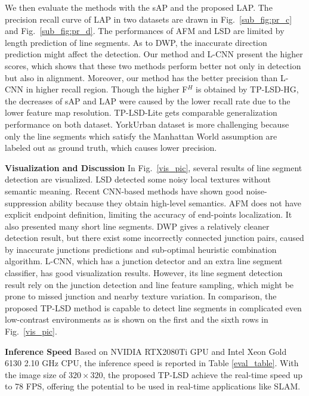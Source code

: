 \documentclass[runningheads]{llncs}
\begin{document}
We then evaluate the methods with the sAP and the proposed LAP. The precision recall curve of LAP in two datasets are drawn in Fig.~\ref{sub_fig:pr_c} and Fig.~\ref{sub_fig:pr_d}. The performances of AFM and LSD are limited by length prediction of line segments.
As to DWP, the inaccurate direction prediction might affect the detection.
Our method and L-CNN present the higher scores, which shows that these two methods perform better not only in detection but also in alignment. Moreover, our method has the better precision than L-CNN in higher recall region.
Though the higher F$^H$ is obtained by TP-LSD-HG, the decreases of sAP and LAP were caused by the lower recall rate due to the lower feature map resolution. TP-LSD-Lite gets comparable generalization performance on both dataset.
YorkUrban dataset is more challenging because only the line segments which satisfy the Manhattan World assumption are labeled out as ground truth, which causes lower precision.

\textbf{Visualization and Discussion}
In Fig.~\ref{vis_pic}, several results of line segment detection are visualized.
LSD detected some noisy local textures without semantic meaning. Recent CNN-based methods have shown good noise-suppression ability because they obtain high-level semantics. AFM does not have explicit endpoint definition, limiting the accuracy of end-points localization. It also presented many short line segments.
DWP gives a relatively cleaner detection result, but there exist some incorrectly connected junction pairs, caused by inaccurate junctions predictions and sub-optimal heuristic combination algorithm. L-CNN, which has a junction detector and an extra line segment classifier, has good visualization results. However, its line segment detection result rely on the junction detection and line feature sampling, which might be prone to missed junction and nearby texture variation. In comparison, the proposed TP-LSD method is capable to detect line segments in complicated even low-contrast environments as is shown on the 
first and the sixth rows in Fig.~\ref{vis_pic}.

\textbf{Inference Speed}
Based on NVIDIA RTX2080Ti GPU and Intel Xeon Gold 6130 2.10 GHz CPU, the inference speed is reported in Table \ref{eval_table}. With the image size of $320\times 320$, the proposed TP-LSD achieve the real-time speed up to 78 FPS, offering the potential to be used in real-time applications like SLAM.
\end{document}
